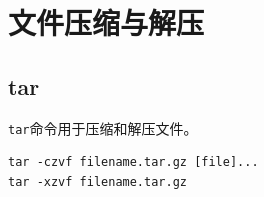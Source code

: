 \documentclass[12pt, openany, oneside]{book}
\begin{document}
\begin{table}[H]
    \centering
    \caption{\lstinline|more|参数说明}
\end{table}

\newpage

\section{文件压缩与解压}

\subsection{tar}

\lstinline|tar|命令用于压缩和解压文件。

\vspace{-0.5cm}
\begin{lstlisting}
tar -czvf filename.tar.gz [file]...
tar -xzvf filename.tar.gz
\end{lstlisting}
\end{document}
